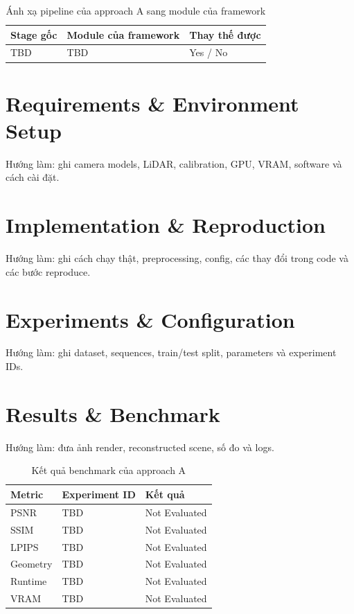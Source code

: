 \begin{table}[H]
  \centering
  \caption{Ánh xạ pipeline của approach A sang module của framework}
  \begin{tabularx}{\linewidth}{X X l}
    \toprule
    \textbf{Stage gốc} & \textbf{Module của framework} & \textbf{Thay thế được} \\
    \midrule
    TBD & TBD & Yes / No \\
    \bottomrule
  \end{tabularx}
\end{table}

\section{Requirements \& Environment Setup}

Hướng làm: ghi camera models, LiDAR, calibration, GPU, VRAM, software và cách cài đặt.

\section{Implementation \& Reproduction}

Hướng làm: ghi cách chạy thật, preprocessing, config, các thay đổi trong code và các bước reproduce.

\section{Experiments \& Configuration}

Hướng làm: ghi dataset, sequences, train/test split, parameters và experiment IDs.

\section{Results \& Benchmark}

Hướng làm: đưa ảnh render, reconstructed scene, số đo và logs.

\begin{table}[H]
  \centering
  \caption{Kết quả benchmark của approach A}
  \begin{tabularx}{\linewidth}{X l l}
    \toprule
    \textbf{Metric} & \textbf{Experiment ID} & \textbf{Kết quả} \\
    \midrule
    PSNR & TBD & Not Evaluated \\
    SSIM & TBD & Not Evaluated \\
    LPIPS & TBD & Not Evaluated \\
    Geometry & TBD & Not Evaluated \\
    Runtime & TBD & Not Evaluated \\
    VRAM & TBD & Not Evaluated \\
    \bottomrule
  \end{tabularx}
\end{table}

